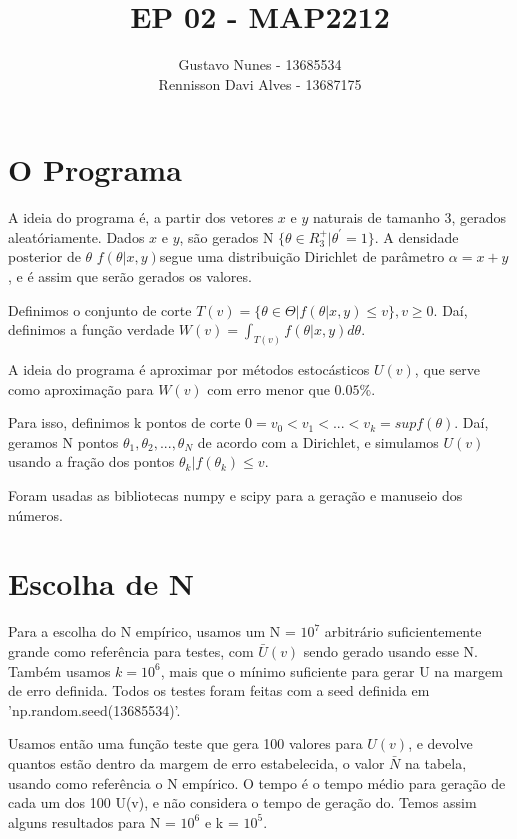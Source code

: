 \documentclass{article}
\date{}
\title{\vspace{-2.0cm}EP 02 - MAP2212}
\author{Gustavo Nunes - 13685534 \\Rennisson Davi Alves - 13687175}
\begin{document}
	\maketitle
	
	\section{O Programa}
	A ideia do programa é, a partir dos vetores $x$ e $y$ naturais de tamanho 3, gerados aleatóriamente. Dados $x$ e $y$, são gerados N $\{\theta \in R_3^+ | \theta^{'}=1 \}$. A densidade posterior de $\theta$ $f(\theta|x, y)$segue uma distribuição Dirichlet de parâmetro $\alpha = x + y$, e é assim que serão gerados os valores.
	
	Definimos o conjunto de corte $T(v) = \{\theta \in \Theta | f(\theta | x, y) \leq v\}, v\geq0$. Daí, definimos a função verdade $W(v) = \int_{T(v)}f(\theta|x, y)d\theta$.
	
	A ideia do programa é aproximar por métodos estocásticos $U(v)$, que serve como aproximação para $W(v)$ com erro menor que $0.05\%$.
	
	Para isso, definimos k pontos de corte $0 = v_0 < v_1 < ... < v_k = sup f(\theta)$. Daí, geramos N pontos $\theta_1, \theta_2, ..., \theta_N$ de acordo com a Dirichlet, e simulamos $U(v)$ usando a fração dos pontos $\theta_k | f(\theta_k)  \leq v $.
	
	Foram usadas as bibliotecas numpy e scipy para a geração e manuseio dos números. 
	\section{Escolha de N}
	
	Para a escolha do N empírico, usamos um N = $10^{7}$ arbitrário suficientemente grande como referência para testes, com $\bar{U}(v)$ sendo gerado usando esse N. Também usamos $k = 10^6$, mais que o mínimo suficiente para gerar U na margem de erro definida. Todos os testes foram feitas com a seed definida em 'np.random.seed(13685534)'.
	
	Usamos então uma função teste que gera 100 valores para $U(v)$, e devolve quantos estão dentro da margem de erro estabelecida, o valor $\bar{N}$ na tabela, usando como referência o N empírico. O tempo é o tempo médio para geração de cada um dos 100 U(v), e não considera o tempo de geração do. Temos assim alguns resultados para N = $10^6$ e k = $10^5$.
	
\end{document}
